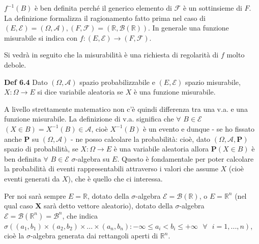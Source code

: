 \documentclass{article}
\begin{document}
$f^{-1}\left( B\right) $ \`{e} ben definita perch\'{e} il generico elemento
di $\mathcal{F}$ \`{e} un sottinsieme di $F$. La definizione formalizza il
ragionamento fatto prima nel caso di $\left( E,\mathcal{E}\right) =\left(
\Omega ,\mathcal{A}\right) ,\left( F,\mathcal{F}\right) =\left( 
\mathbb{R}
,\mathcal{B}\left( 
\mathbb{R}
\right) \right) $. In generale una funzione misurabile si indica con $%
f:\left( E,\mathcal{E}\right) \rightarrow \left( F,\mathcal{F}\right) $.

Si vedr\`{a} in seguito che la misurabilit\`{a} \`{e} una richiesta di
regolarit\`{a} di $f$ molto debole.

\textbf{Def 6.4} Dato $\left( \Omega ,\mathcal{A}\right) $ spazio
probabilizzabile e $\left( E,\mathcal{E}\right) $ spazio misurabile, $%
X:\Omega \rightarrow E$ si dice variabile aleatoria se $X$ \`{e} una
funzione misurabile.

A livello strettamente matematico non c'\`{e} quindi differenza tra una v.a.
e una funzione misurabile. La definizione di v.a. significa che $\forall $ $%
B\in \mathcal{E}$ $\left( X\in B\right) =X^{-1}\left( B\right) \in \mathcal{A%
}$, cio\`{e} $X^{-1}\left( B\right) $ \`{e} un evento e dunque - se ho
fissato anche $\mathbf{P}$ su $\left( \Omega ,\mathcal{A}\right) $ - ne
posso calcolare la probabilit\`{a}: cio\`{e}, dato $\left( \Omega ,\mathcal{A%
},\mathbf{P}\right) $ spazio di probabilit\`{a}, se $X:\Omega \rightarrow E$ 
\`{e} una variabile aleatoria allora $\mathbf{P}\left( X\in B\right) $ \`{e}
ben definita $\forall $ $B\in \mathcal{E}$ $\sigma $-algebra su $E$. Questo 
\`{e} fondamentale per poter calcolare la probabilit\`{a} di eventi
rappresentabili attraverso i valori che assume $X$ (cio\`{e} eventi generati
da $X$), che \`{e} quello che ci interessa.

Per noi sar\`{a} sempre $E=%
\mathbb{R}
$, dotato della $\sigma $-algebra $\mathcal{E=B}\left( 
\mathbb{R}
\right) $, o $E=%
\mathbb{R}
^{n}$ (nel qual caso $\mathbf{X}$ sar\`{a} detto vettore aleatorio), dotato
della $\sigma $-algebra $\mathcal{E=B}\left( 
\mathbb{R}
^{n}\right) =\mathcal{B}^{n}$, che indica $\sigma \left( \left(
a_{1},b_{1}\right) \times \left( a_{2},b_{2}\right) \times ...\times \left(
a_{n},b_{n}\right) :-\infty \leq a_{i}<b_{i}\leq +\infty \text{ }\forall 
\text{ }i=1,...,n\right) $, cio\`{e} la $\sigma $-algebra generata dai
rettangoli aperti di $%
\mathbb{R}
^{n}$.
\end{document}
